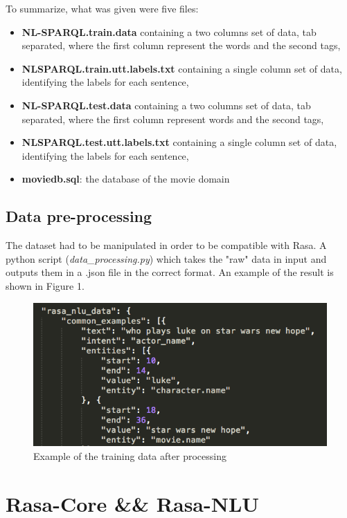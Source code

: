 \documentclass[11pt,a4paper]{article}
\begin{document}
To summarize, what was given were five files:
\begin{itemize}
	\item {\bfseries NL-SPARQL.train.data} containing a two columns set of data, tab separated, where the first column represent the words and the second tags,
	\item {\bfseries NLSPARQL.train.utt.labels.txt} containing a single column set of data, identifying the labels for each sentence,
	\item {\bfseries NL-SPARQL.test.data} containing a two columns set of data, tab separated, where the first column represent words and the second tags,
	\item {\bfseries NLSPARQL.test.utt.labels.txt} containing a single column set of data, identifying the labels for each sentence,
	\item {\bfseries moviedb.sql}: the database of the movie domain
\end{itemize}


\subsection{Data pre-processing}

The dataset had to be manipulated in order to be compatible with Rasa. A python script (\textit{data\_processing.py}) which takes the "raw" data in input and outputs them in a .json file in the correct format. An example of the result is shown in Figure 1.\\

\begin{figure}
	\includegraphics[scale=.7]{images/data_example}
	\caption{Example of the training data after processing}
\end{figure}

\section{Rasa-Core \&\& Rasa-NLU}
\end{document}
